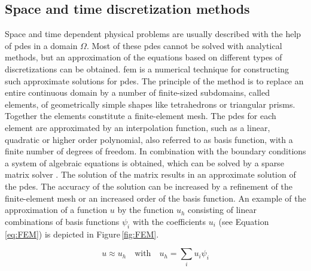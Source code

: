 \subsection{Space and time discretization methods}
\label{subsec:FEM}
Space and time dependent physical problems are usually described with the help of \glspl{pde} in a domain $\Omega$. Most of these \glspl{pde} cannot be solved with analytical methods, but an approximation of the equations based on different types of discretizations can be obtained. \Gls{fem} is a numerical technique for constructing such approximate solutions for \glspl{pde}. The principle of the method is to replace an entire continuous domain by a number of finite-sized subdomains, called elements, of geometrically simple shapes like tetrahedrons or triangular prisms. Together the elements constitute a finite-element mesh. The \glspl{pde} for each element are approximated by an interpolation function, such as a linear, quadratic or higher order polynomial, also referred to as basis function, with a finite number of degrees of freedom. In combination with the boundary conditions a  system of algebraic equations is obtained, which can be solved by a sparse matrix solver \cite{john2016finite}. The solution of the matrix results in an approximate solution of the \glspl{pde}. The accuracy of the solution can be increased by a refinement of the finite-element mesh or an increased order of the basis function. An example of the approximation of a function $u$ by the function $u_{h}$ consisting of linear combinations of basis functions $\psi_{i}$ with the coefficients $u_{i}$ (see Equation\,\ref{eq:FEM}) is depicted in Figure\,\ref{fig:FEM}. 

\begin{equation}
u\approx u_{h} \quad \textrm{with} \quad u_{h}=\sum_{i}u_{i}\psi_{i}
\label{eq:FEM}
\end{equation}


